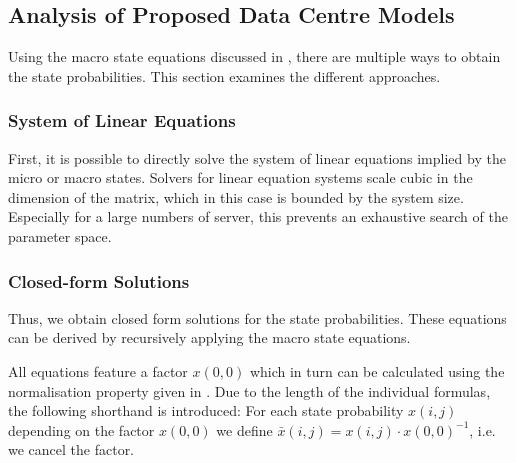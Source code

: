 \subsection{Analysis of Proposed Data Centre Models}\label{sec:cloud:data_centers:closed_form_solution}
Using the macro state equations discussed in , there are multiple ways to obtain the state probabilities.
This section examines the different approaches.

\subsubsection*{System of Linear Equations}
First, it is possible to directly solve the system of linear equations implied by the micro or macro states.
Solvers for linear equation systems scale cubic in the dimension of the matrix, which in this case is bounded by the system size.
Especially for a large numbers of server, this prevents an exhaustive search of the parameter space.

\subsubsection*{Closed-form Solutions}
Thus, we obtain closed form solutions for the state probabilities.
These equations can be derived by recursively applying the macro state equations.

All equations feature a factor \(x(0, 0)\) which in turn can be calculated using the normalisation property given in .
Due to the length of the individual formulas, the following shorthand is introduced:
For each state probability \(x(i, j)\) depending on the factor \(x(0,0)\) we define \(\bar{x}(i, j) = x(i, j) \cdot x(0, 0)^{-1}\), i.e. we cancel the factor.

